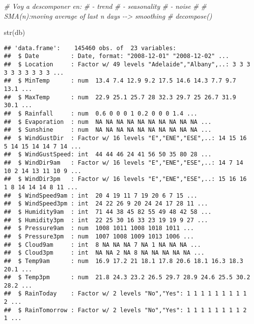 \documentclass[
]{article}
\newenvironment{Shaded}{\begin{snugshade}}{\end{snugshade}}
\newcommand{\CommentTok}[1]{\textcolor[rgb]{0.56,0.35,0.01}{\textit{#1}}}
\newcommand{\FunctionTok}[1]{\textcolor[rgb]{0.00,0.00,0.00}{#1}}
\newcommand{\NormalTok}[1]{#1}
\begin{document}
\begin{Shaded}
\begin{Highlighting}[]
\CommentTok{\# Voy a descomponer en:}
\CommentTok{\# {-} trend}
\CommentTok{\# {-} seasonality}
\CommentTok{\# {-} noise}
\CommentTok{\# }
\CommentTok{\# SMA(n):moving average of last n days {-}{-}\textgreater{} smoothing}
\CommentTok{\# decompose()}
\end{Highlighting}
\end{Shaded}

\begin{Shaded}
\begin{Highlighting}[]
\FunctionTok{str}\NormalTok{(db)}
\end{Highlighting}
\end{Shaded}

\begin{verbatim}
## 'data.frame':    145460 obs. of  23 variables:
##  $ Date         : Date, format: "2008-12-01" "2008-12-02" ...
##  $ Location     : Factor w/ 49 levels "Adelaide","Albany",..: 3 3 3 3 3 3 3 3 3 3 ...
##  $ MinTemp      : num  13.4 7.4 12.9 9.2 17.5 14.6 14.3 7.7 9.7 13.1 ...
##  $ MaxTemp      : num  22.9 25.1 25.7 28 32.3 29.7 25 26.7 31.9 30.1 ...
##  $ Rainfall     : num  0.6 0 0 0 1 0.2 0 0 0 1.4 ...
##  $ Evaporation  : num  NA NA NA NA NA NA NA NA NA NA ...
##  $ Sunshine     : num  NA NA NA NA NA NA NA NA NA NA ...
##  $ WindGustDir  : Factor w/ 16 levels "E","ENE","ESE",..: 14 15 16 5 14 15 14 14 7 14 ...
##  $ WindGustSpeed: int  44 44 46 24 41 56 50 35 80 28 ...
##  $ WindDir9am   : Factor w/ 16 levels "E","ENE","ESE",..: 14 7 14 10 2 14 13 11 10 9 ...
##  $ WindDir3pm   : Factor w/ 16 levels "E","ENE","ESE",..: 15 16 16 1 8 14 14 14 8 11 ...
##  $ WindSpeed9am : int  20 4 19 11 7 19 20 6 7 15 ...
##  $ WindSpeed3pm : int  24 22 26 9 20 24 24 17 28 11 ...
##  $ Humidity9am  : int  71 44 38 45 82 55 49 48 42 58 ...
##  $ Humidity3pm  : int  22 25 30 16 33 23 19 19 9 27 ...
##  $ Pressure9am  : num  1008 1011 1008 1018 1011 ...
##  $ Pressure3pm  : num  1007 1008 1009 1013 1006 ...
##  $ Cloud9am     : int  8 NA NA NA 7 NA 1 NA NA NA ...
##  $ Cloud3pm     : int  NA NA 2 NA 8 NA NA NA NA NA ...
##  $ Temp9am      : num  16.9 17.2 21 18.1 17.8 20.6 18.1 16.3 18.3 20.1 ...
##  $ Temp3pm      : num  21.8 24.3 23.2 26.5 29.7 28.9 24.6 25.5 30.2 28.2 ...
##  $ RainToday    : Factor w/ 2 levels "No","Yes": 1 1 1 1 1 1 1 1 1 2 ...
##  $ RainTomorrow : Factor w/ 2 levels "No","Yes": 1 1 1 1 1 1 1 1 2 1 ...
\end{verbatim}
\end{document}
